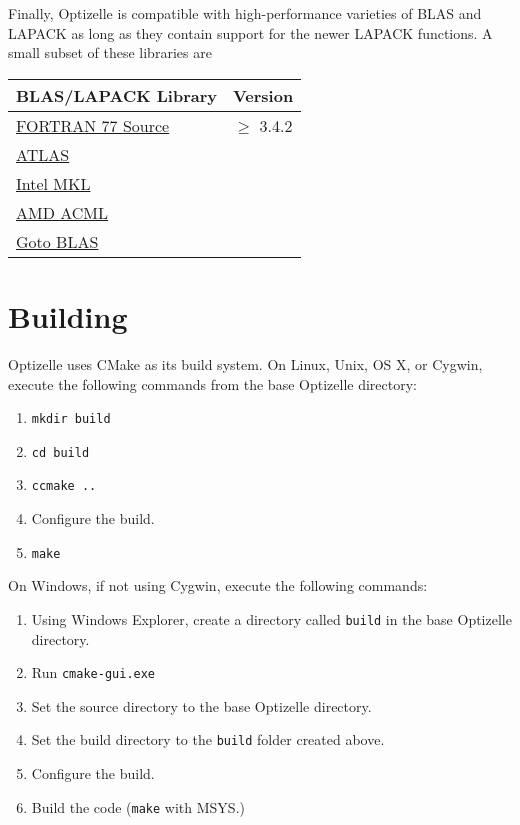 \documentclass{report}
\makeatletter
\newcommand{\textct}{\begingroup\@activeus\@textct}
\newcommand*{\@textct}[1]{\texttt{#1}\endgroup}
\makeatother
\begin{document}
        Finally, Optizelle is compatible with high-performance varieties of BLAS and LAPACK as long as they contain support for the newer LAPACK functions.  A small subset of these libraries are
\label{tbl:blaslapack}
\begin{center}\begin{tabular}{|l|l|}\hline
{\bf BLAS/LAPACK Library} & \bf{Version}\\\hline
\href{http://www.netlib.org/lapack}{FORTRAN 77 Source} & $\geq$ 3.4.2\\\hline
\href{http://math-atlas.sourceforge.net}{ATLAS} & \\\hline
\href{http://software.intel.com/en-us/intel-mkl}{Intel MKL} & \\\hline
\href{http://developer.amd.com/tools-and-sdks/cpu-development/amd-core-math-library-acml}{AMD ACML} & \\\hline
\href{https://www.tacc.utexas.edu/tacc-projects/gotoblas2}{Goto BLAS} & \\\hline
\end{tabular}\end{center}

\section{Building}

        Optizelle uses CMake as its build system.  On Linux, Unix, OS X, or Cygwin, execute the following commands from the base Optizelle directory:
\begin{enumerate}
    \item \textct{mkdir build}
    \item \textct{cd build}
    \item \textct{ccmake ..}
    \item Configure the build.
    \item \textct{make}
\end{enumerate}
On Windows, if not using Cygwin, execute the following commands:
\begin{enumerate}
    \item Using Windows Explorer, create a directory called \textct{build} in the base Optizelle directory.
    \item Run \textct{cmake-gui.exe}
    \item Set the source directory to the base Optizelle directory.
    \item Set the build directory to the \textct{build} folder created above.
    \item Configure the build.
    \item Build the code (\textct{make} with MSYS.)
\end{enumerate}
\end{document}
